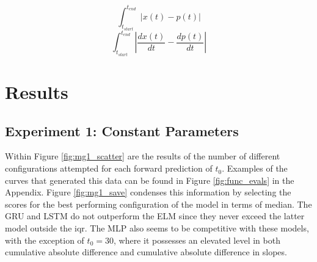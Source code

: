 \documentclass[11pt]{article}
\begin{document}
\begin{equation}
  \int_{t_{start}}^{t_{end}} | x(t) - p(t) |
\label{eq:cumabs}
\end{equation}
\begin{equation}
  \int_{t_{start}}^{t_{end}} | \frac{dx(t)}{dt} - \frac{dp(t)}{dt} |
\label{eq:cumabsderiv}
\end{equation}

\section {Results}
\subsection {Experiment 1: Constant Parameters}

Within Figure \ref{fig:mg1_scatter} are the results of the
number of different configurations attempted for each forward
prediction of $t_0$. Examples of the curves that generated this data
can be found in Figure \ref{fig:func_evals} in the Appendix. Figure \ref{fig:mg1_save} condenses this information by selecting the scores for
the best performing configuration of the model in terms of
median. The GRU and LSTM do not
outperform the ELM since they never exceed the latter model outside
the iqr. The MLP also seems to be competitive with these models, with
the exception of $t_0 = 30$, where it possesses an elevated level in
both cumulative absolute difference and cumulative absolute difference
in slopes. 

\end{document}
